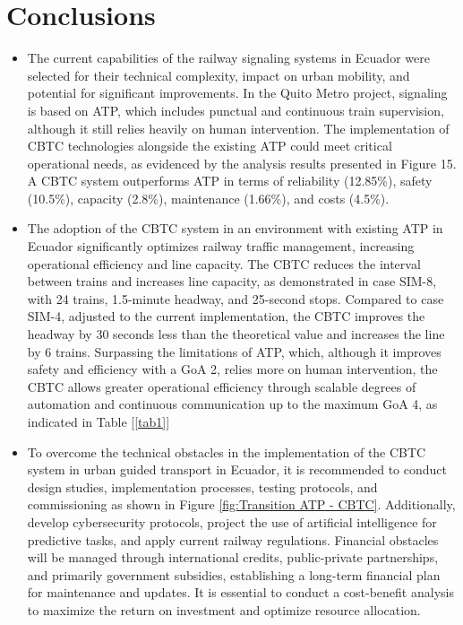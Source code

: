 \documentclass[conference]{IEEEtran}
\begin{document}

\section{Conclusions}
\begin{itemize}
\item The current capabilities of the railway signaling systems in Ecuador were selected for their technical complexity, impact on urban mobility, and potential for significant improvements. In the Quito Metro project, signaling is based on ATP, which includes punctual and continuous train supervision, although it still relies heavily on human intervention. The implementation of CBTC technologies alongside the existing ATP could meet critical operational needs, as evidenced by the analysis results presented in Figure 15. A CBTC system outperforms ATP in terms of reliability (12.85\%), safety (10.5\%), capacity (2.8\%), maintenance (1.66\%), and costs (4.5\%).

\item The adoption of the CBTC system in an environment with existing ATP in Ecuador significantly optimizes railway traffic management, increasing operational efficiency and line capacity. The CBTC reduces the interval between trains and increases line capacity, as demonstrated in case SIM-8, with 24 trains, 1.5-minute headway, and 25-second stops. Compared to case SIM-4, adjusted to the current implementation, the CBTC improves the headway by 30 seconds less than the theoretical value and increases the line by 6 trains. Surpassing the limitations of ATP, which, although it improves safety and efficiency with a GoA 2, relies more on human intervention, the CBTC allows greater operational efficiency through scalable degrees of automation and continuous communication up to the maximum GoA 4, as indicated in Table  [\ref{tab1}]

\item To overcome the technical obstacles in the implementation of the CBTC system in urban guided transport in Ecuador, it is recommended to conduct design studies, implementation processes, testing protocols, and commissioning as shown in Figure \ref{fig:Transition ATP - CBTC}. Additionally, develop cybersecurity protocols, project the use of artificial intelligence for predictive tasks, and apply current railway regulations. Financial obstacles will be managed through international credits, public-private partnerships, and primarily government subsidies, establishing a long-term financial plan for maintenance and updates. It is essential to conduct a cost-benefit analysis to maximize the return on investment and optimize resource allocation.
\end{itemize}
\end{document}
